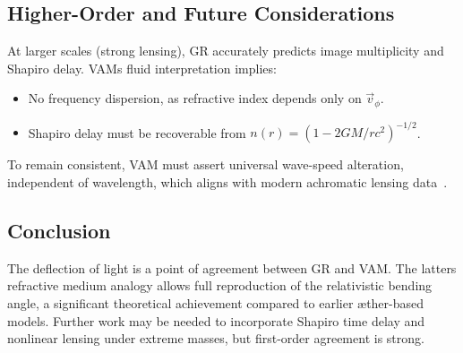 \subsection*{Higher-Order and Future Considerations}
At larger scales (strong lensing), GR accurately predicts image multiplicity and Shapiro delay. VAM\rqs s fluid interpretation implies:
\begin{itemize}
    \item No frequency dispersion, as refractive index depends only on $\vec{v}_\phi$.
    \item Shapiro delay must be recoverable from $n(r) = (1 - 2GM/rc^2)^{-1/2}$.
\end{itemize}
To remain consistent, VAM must assert universal wave-speed alteration, independent of wavelength, which aligns with modern achromatic lensing data~\cite{eubanks1997vla,shapiro2004gravitational}.

\subsection*{Conclusion}
The deflection of light is a point of agreement between GR and VAM. The latter\rqs s refractive medium analogy allows full reproduction of the relativistic bending angle, a significant theoretical achievement compared to earlier æther-based models. Further work may be needed to incorporate Shapiro time delay and nonlinear lensing under extreme masses, but first-order agreement is strong.